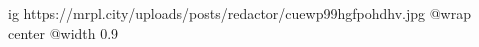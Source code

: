  
 
 
 
 

\ifcmt
  ig https://mrpl.city/uploads/posts/redactor/cuewp99hgfpohdhv.jpg
  @wrap center
  @width 0.9
\fi
